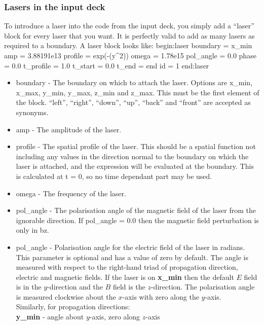 \documentclass[12pt,a4paper]{article}
\newcommand{\inlineemph}[1]{{\color{warwicklight} \bf{#1}}}
\newenvironment{boxverbatim}{\lboxverbatim{none}}{\endlboxverbatim}
\begin{document}
\subsubsection{Lasers in the input deck}

To introduce a laser into the code from the input deck, you simply add a
``laser'' block for every laser that you want. It is perfectly valid to add as
many lasers as required to a boundary. A laser block looks like:
\begin{boxverbatim}
begin:laser
   boundary = x_min
   amp = 3.88191e13
   profile = exp(-(y^2))
   omega = 1.78e15
   pol_angle = 0.0
   phase = 0.0
   t_profile = 1.0
   t_start = 0.0
   t_end = end
   id = 1
end:laser
\end{boxverbatim}

\begin{itemize}
\item boundary - The boundary on which to attach the laser. Options are x\_min,
  x\_max, y\_min, y\_max, z\_min and z\_max. This must be the first element of
  the block. ``left'', ``right'', ``down'', ``up'', ``back'' and ``front'' are
  accepted as synonyms.
\item amp - The amplitude of the laser.
\item profile - The spatial profile of the laser. This should be a spatial
  function not including any values in the direction normal to the boundary
  on which the laser is attached, and the expression will be evaluated at the
  boundary. This is calculated at t = 0, so no time dependant part may be used.
\item omega - The frequency of the laser.
\item pol\_angle - The polarisation angle of the magnetic field of the laser
  from the ignorable direction. If pol\_angle = 0.0 then the magnetic field
  perturbation is only in bz.
\item pol\_angle - Polarisation angle for the electric field of the laser in
  radians. This parameter is optional and has a value of zero by default.
  The angle is measured with respect to the right-hand triad of propagation
  direction, electric and magnetic fields. If the laser is on
  \inlineemph{x\_min} then the default $E$ field is in the $y$-direction and
  the $B$ field is the $z$-direction. The polarisation angle is measured
  clockwise about the $x$-axis with zero along the $y$-axis.\\
  Similarly, for propagation directions:\\
\inlineemph{y\_min} - angle about $y$-axis, zero along $z$-axis\\

\end{itemize}
\end{document}
